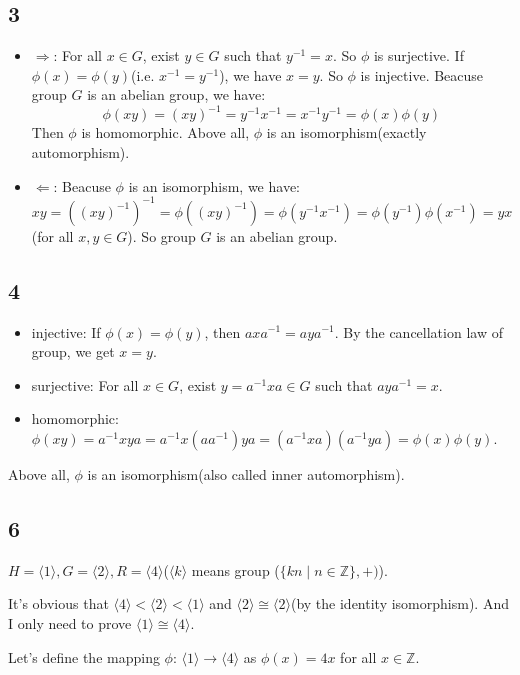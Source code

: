 \documentclass{article}
\begin{document}
		\subsection*{3}
			\begin{itemize}
				\item $\Rightarrow$: For all $x \in G$, exist $y \in G$ such that
					$y^{-1} = x$. So $\phi$ is surjective. If $\phi(x) = \phi(y)$(i.e.
					$x^{-1} = y^{-1}$), we have $x = y$. So $\phi$ is injective. Beacuse
					group $G$ is an abelian group, we have:
					$$
					\phi(xy) = (xy)^{-1} = y^{-1}x^{-1} = x^{-1}y^{-1} = \phi(x)\phi(y)
					$$
					Then $\phi$ is homomorphic. Above all, $\phi$ is an
					isomorphism(exactly automorphism).
				\item $\Leftarrow$: Beacuse $\phi$ is an isomorphism, we have:
					$$
					xy = ((xy)^{-1})^{-1} = \phi((xy)^{-1}) = \phi(y^{-1}x^{-1}) =
					\phi(y^{-1})\phi(x^{-1}) = yx
					$$
					(for all $x,y \in G$). So group $G$ is an abelian group.
			\end{itemize}
		\subsection*{4}
			\begin{itemize}
				\item injective: If $\phi(x) = \phi(y)$, then $axa^{-1} = aya^{-1}$. By
					the cancellation law of group, we get $x = y$.
				\item surjective: For all $x \in G$, exist $y = a^{-1}xa \in G$ such that
					$aya^{-1} = x$.
				\item homomorphic: $\phi(xy) = a^{-1}xya = a^{-1}x(aa^{-1})ya =
					(a^{-1}xa)(a^{-1}ya) = \phi(x)\phi(y)$.
			\end{itemize}
			Above all, $\phi$ is an isomorphism(also called inner automorphism).
		\subsection*{6}
			$H = \langle 1 \rangle, G = \langle 2 \rangle, R = \langle 4
			\rangle$($\langle k \rangle$ means group ($\{kn \mid n \in \mathbb{Z}\},+)$).

			It's obvious that $\langle 4 \rangle < \langle 2 \rangle < \langle 1
			\rangle$ and $\langle 2 \rangle \cong \langle 2 \rangle$(by the identity
			isomorphism). And I only need to prove $\langle 1 \rangle \cong \langle 4 \rangle$.

			Let's define the mapping $\phi$: $\langle 1 \rangle \rightarrow \langle 4
			\rangle$ as $\phi(x) = 4x$ for all $x \in \mathbb{Z}$.
\end{document}
